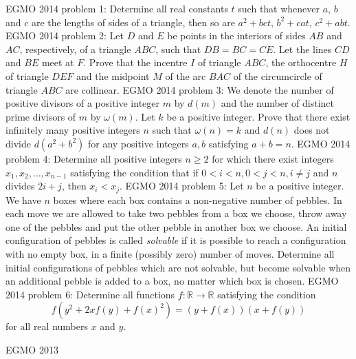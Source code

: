 EGMO 2014 problem 1:  Determine all real constants $t$ such that whenever $a$, $b$ and $c$ are the lengths of sides of a triangle, then so are $a^2+bct$, $b^2+cat$, $c^2+abt$. 
EGMO 2014 problem 2:  Let $D$ and $E$ be points in the interiors of sides $AB$ and $AC$, respectively, of a triangle $ABC$, such that $DB = BC = CE$. Let the lines $CD$ and $BE$ meet at $F$. Prove that the incentre $I$ of triangle $ABC$, the orthocentre $H$ of triangle $DEF$ and the midpoint $M$ of the arc $BAC$ of the circumcircle of triangle $ABC$ are collinear. 
EGMO 2014 problem 3:  We denote the number of positive divisors of a positive integer $m$ by $d(m)$ and the number of distinct prime divisors of $m$ by $\omega(m)$. Let $k$ be a positive integer. Prove that there exist infinitely many positive integers $n$ such that $\omega(n) = k$ and $d(n)$ does not divide $d(a^2+b^2)$ for any positive integers $a, b$ satisfying $a + b = n$. 
EGMO 2014 problem 4:  Determine all positive integers $n\geq 2$ for which there exist integers $x_1,x_2,\ldots ,x_{n-1}$ satisfying the condition that if $0<i<n,0<j<n, i\neq j$ and $n$ divides $2i+j$, then $x_i<x_j$. 
EGMO 2014 problem 5:  Let $n$ be a positive integer. We have $n$ boxes where each box contains a non-negative number of pebbles. In each move we are allowed to take two pebbles from a box we choose, throw away one of the pebbles and put the other pebble in another box we choose. An initial configuration of pebbles is called \textit{solvable} if it is possible to reach a configuration with no empty box, in a finite (possibly zero) number of moves. Determine all initial configurations of pebbles which are not solvable, but become solvable when an additional pebble is added to a box, no matter which box is chosen. 
EGMO 2014 problem 6:  Determine all functions $f:\mathbb R\rightarrow\mathbb R$ satisfying the condition
\[ f(y^2+2xf(y)+f(x)^2)=(y+f(x))(x+f(y)) \]
for all real numbers $x$ and $y$. 

EGMO 2013 

